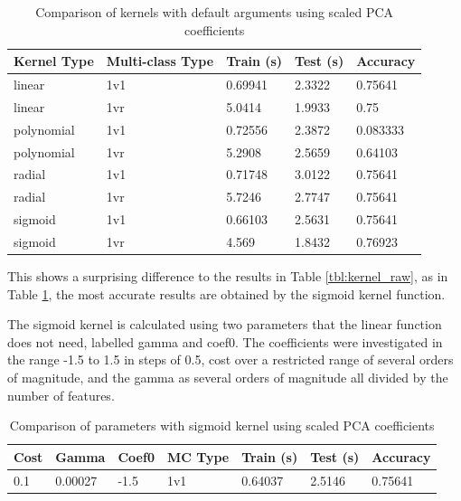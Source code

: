 \documentclass[a4paper, 10pt, conference]{ieeeconf}
\begin{document}
\begin{table}[!ht]
\centering
\caption{Comparison of kernels with default arguments using scaled PCA coefficients}\label{tbl:kernel_pca}
\begin{tabular}{lllll}
Kernel Type & Multi-class Type & Train (s) & Test (s) & Accuracy\\ \hline
linear & 1v1 & 0.69941 & 2.3322 & 0.75641\\ \hline
linear & 1vr & 5.0414 & 1.9933 & 0.75\\ \hline
polynomial & 1v1 & 0.72556 & 2.3872 & 0.083333\\ \hline
polynomial & 1vr & 5.2908 & 2.5659 & 0.64103\\ \hline
radial & 1v1 & 0.71748 & 3.0122 & 0.75641\\ \hline
radial & 1vr & 5.7246 & 2.7747 & 0.75641\\ \hline
sigmoid & 1v1 & 0.66103 & 2.5631 & 0.75641\\ \hline
sigmoid & 1vr & 4.569 & 1.8432 & 0.76923\\ \hline
\end{tabular}
\end{table}

This shows a surprising difference to the results in Table \ref{tbl:kernel_raw}, as in Table \ref{tbl:kernel_pca}, the most accurate results are obtained by the sigmoid kernel function.

The sigmoid kernel is calculated using two parameters that the linear function does not need, labelled gamma and coef0. The coefficients were investigated in the range -1.5 to 1.5 in steps of 0.5, cost over a restricted range of several orders of magnitude, and the gamma as several orders of magnitude all divided by the number of features.


\begin{table}[!ht]
\centering
\caption{Comparison of parameters with sigmoid kernel using scaled PCA coefficients}\label{tbl:sigmoid_params}
\begin{tabular}{lllllll}
Cost & Gamma & Coef0 & MC Type & Train (s) & Test (s) & Accuracy\\ \hline
0.1 & 0.00027 & -1.5 & 1v1 & 0.64037 & 2.5146 & 0.75641\\ \hline
\end{tabular}
\end{table}
\end{document}
